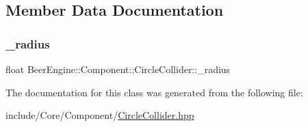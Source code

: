 \subsection{Member Data Documentation}
\mbox{\label{class_beer_engine_1_1_component_1_1_circle_collider_abbf603985bff01588e81fdf689925f25}} 
\subsubsection{\texorpdfstring{\+\_\+radius}{\_radius}}
{\footnotesize\ttfamily float Beer\+Engine\+::\+Component\+::\+Circle\+Collider\+::\+\_\+radius}



The documentation for this class was generated from the following file\+:\begin{DoxyCompactItemize}
\item 
include/\+Core/\+Component/\mbox{\hyperlink{_circle_collider_8hpp}{Circle\+Collider.\+hpp}}\end{DoxyCompactItemize}

